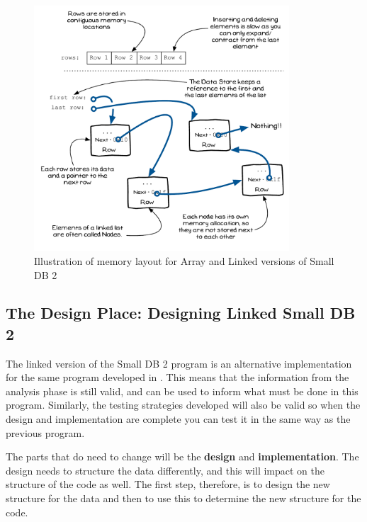 \begin{figure}[htbp]
   \centering
   \includegraphics[width=0.85\textwidth]{./topics/dynamic-memory/diagrams/ArrayVsList} 
   \caption{Illustration of memory layout for Array and Linked versions of Small DB 2}
   \label{fig:array-vs-linked}
\end{figure}


\subsection{The Design Place: Designing Linked Small DB 2} %
\label{sub:the_design_place_designing_linked_small_db_2}

The linked version of the Small DB 2 program is an alternative implementation for the same program developed in . This means that the information from the analysis phase is still valid, and can be used to inform what must be done in this program. Similarly, the testing strategies developed will also be valid so when the design and implementation are complete you can test it in the same way as the previous program.

The parts that do need to change will be the \textbf{design} and \textbf{implementation}. The design needs to structure the data differently, and this will impact on the structure of the code as well. The first step, therefore, is to design the new structure for the data and then to use this to determine the new structure for the code.

